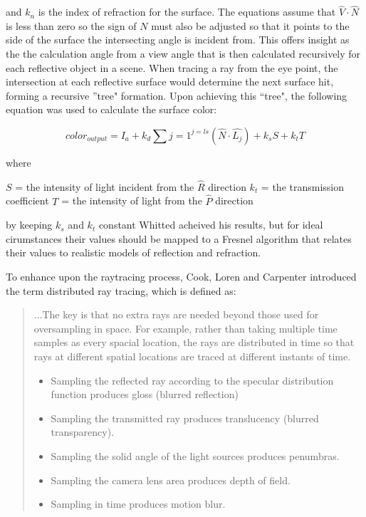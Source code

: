 and $k_{n}$ is the index of refraction for the surface.  The equations assume that ${\hat{V} \cdot \hat{N}}$ is less than zero so the sign of ${N}$ must also be adjusted so that it points to the side of the surface the intersecting angle is incident from.  This offers insight as the the calculation angle from a view angle that is then calculated recursively for each reflective object in a scene.  When tracing a ray from the eye point, the intersection at each reflective surface would determine the next surface hit, forming a recursive ''tree" formation.  Upon achieving this ``tree", the following equation was used to calculate the surface color:

\begin{equation}
\label{eq:raytracing5}
color_{output} = I_{a} + k_{d} \sum{j=1}^{j=ls}(\hat{N} \cdot \hat{L_{j}}) + k_{s}S + k_{t}T
\end{equation}

where \newline

\noindent
$S$ = the intensity of light incident from the $\hat{R}$ direction\newline
$k_{t}$ = the transmission coefficient\newline
$T$ = the intensity of light from the $\hat{P}$ direction\newline

by keeping $k_{s}$ and $k_{t}$ constant Whitted acheived his results, but for ideal cirumstances their values should be mapped to a Fresnel algorithm that relates their values to realistic models of reflection and refraction.

To enhance upon the raytracing process, Cook, Loren and Carpenter introduced the term distributed ray tracing, which is defined as:

\begin{quote}
...The key is that no extra rays are needed beyond those used for oversampling in space.  For example, rather than taking multiple time samples as every spacial location, the rays are distributed in time so that rays at different spatial locations are traced at different instants of time.
\begin{itemize}
\item Sampling the reflected ray according to the specular distribution function produces gloss (blurred reflection)
\item Sampling the transmitted ray produces translucency (blurred transparency).
\item Sampling the solid angle of the light sources produces penumbras.
\item Sampling the camera lens area produces depth of field.
\item Sampling in time produces motion blur.
\end{itemize}
\end{quote}

